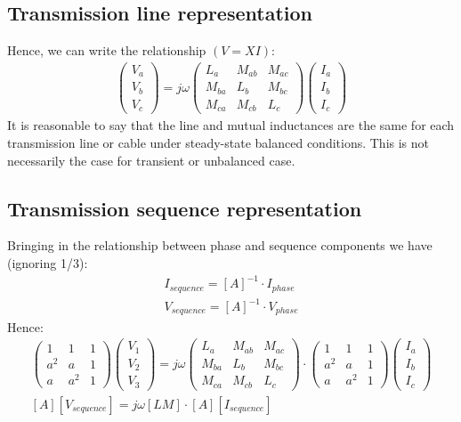 \documentclass[class=report, crop=false, 12pt,a4paper]{standalone}
\begin{document}
\subsection{Transmission line representation}
Hence, we can write the relationship $(V = XI)$: 
\begin{gather}
	\begin{pmatrix}
		V_a\\
		V_b\\
		V_c
	\end{pmatrix} = j \omega \begin{pmatrix}
		L_a & M_{ab} & M_{ac}\\
		M_{ba} & L_b & M_{bc}\\
		M_{ca} & M_{cb} & L_c
	\end{pmatrix}\begin{pmatrix}
		I_a\\
		I_b\\
		I_c
	\end{pmatrix}
\end{gather}
It is reasonable to say that the line and mutual inductances are the same for each transmission line or cable under steady-state balanced conditions. This is not necessarily the case for transient or unbalanced case.
\subsection{Transmission sequence representation}
Bringing in the relationship between phase and sequence components we have (ignoring 1/3):
\begin{gather}
	I_{sequence} = \left[A\right]^{-1} \cdot I_{phase}\\
	V_{sequence} = \left[A\right]^{-1} \cdot V_{phase}
\end{gather}
Hence:
\begin{gather}
	\begin{pmatrix}
		1 & 1 & 1\\
		a^2 & a & 1\\
		a & a^2 & 1
	\end{pmatrix}\begin{pmatrix}
		V_1\\
		V_2\\
		V_3
	\end{pmatrix} = j\omega\begin{pmatrix}
		L_a & M_{ab} & M_{ac}\\
		M_{ba} & L_b & M_{bc}\\
		M_{ca} & M_{cb} & L_c
	\end{pmatrix}\cdot\begin{pmatrix}
		1 & 1 & 1\\
		a^2 & a & 1\\
		a & a^2 & 1
	\end{pmatrix}\begin{pmatrix}
		I_a\\
		I_b\\
		I_c
	\end{pmatrix}\\
	\left[A\right] \left[V_{sequence}\right] = j\omega \left[LM\right]\cdot \left[A\right]\left[I_{sequence}\right]
\end{gather}
\end{document}
